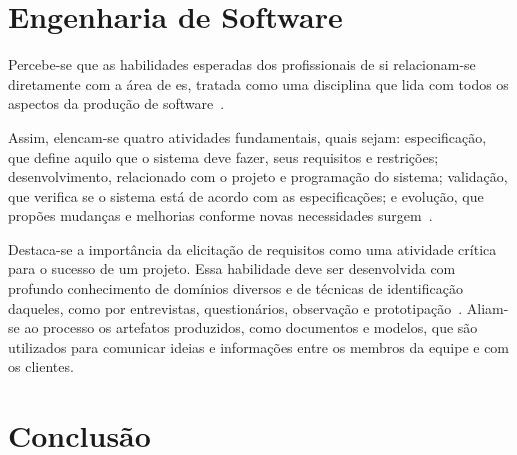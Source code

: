 \documentclass[12pt]{article}
\begin{document}
\section{Engenharia de Software}%
\label{sec:engenharia_de_software}

Percebe-se que as habilidades esperadas dos profissionais de \gls{si} relacionam-se diretamente com a área de \gls{es}, tratada como uma disciplina que lida com todos os aspectos da produção de software~\cite{sommerville2011software}.

Assim, elencam-se quatro atividades fundamentais, quais sejam: especificação, que define aquilo que o sistema deve fazer, seus requisitos e restrições; desenvolvimento, relacionado com o projeto e programação do sistema; validação, que verifica se o sistema está de acordo com as especificações; e evolução, que propões mudanças e melhorias conforme novas necessidades surgem~\cite{sommerville2011software}.

Destaca-se a importância da elicitação de requisitos como uma atividade crítica para o sucesso de um projeto.
Essa habilidade deve ser desenvolvida com profundo conhecimento de domínios diversos e de técnicas de identificação daqueles, como por entrevistas, questionários, observação e prototipação~\cite{sommerville2011software}.
Aliam-se ao processo os artefatos produzidos, como documentos e modelos, que são utilizados para comunicar ideias e informações entre os membros da equipe e com os clientes.

\section{Conclusão}%
\label{sec:conclusao}



\printbibliography{}
\end{document}
